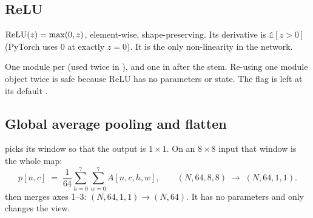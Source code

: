 \subsection{ReLU}
\label{sec:relu}

\begin{idea}
$\operatorname{ReLU}(z) = \max(0,z)$, element-wise, shape-preserving. Its derivative is $\mathbb 1[z>0]$ (PyTorch uses 0 at exactly $z=0$). It is the only non-linearity in the network.
\end{idea}

\begin{repo}
One  module per  (used twice in ), and one in  after the stem. Re-using one module object twice is safe because ReLU has no parameters or state. The  flag is left at its default .
\end{repo}

\subsection{Global average pooling and flatten}
\label{sec:gap}

\begin{idea}
 picks its window so that the output is $1\times1$. On an $8\times8$ input that window is the whole map:
\[
  p[n,c] \;=\; \frac{1}{64}\sum_{h=0}^{7}\sum_{w=0}^{7} A[n,c,h,w], \qquad (N,64,8,8)\;\longrightarrow\;(N,64,1,1).
\]
 then merges axes 1--3: $(N,64,1,1)\to(N,64)$. It has no parameters and only changes the view.
\end{idea}

\begin{center}
\end{center}

